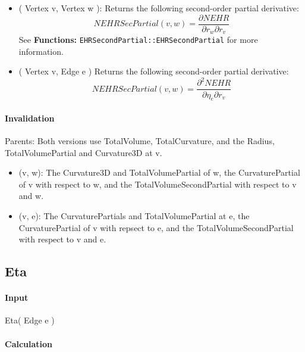 \begin{itemize}
\item ( Vertex v, Vertex w ): Returns the following second-order partial
derivative: 
\begin{equation*}
NEHRSecPartial(v,w)=\frac{\partial NEHR}{\partial r_{w}\partial r_{v}}
\end{equation*}%
See \textbf{Functions: }\texttt{EHRSecondPartial::EHRSecondPartial} for more
information.

\item ( Vertex v, Edge e ) Returns the following second-order partial
derivative: 
\begin{equation*}
NEHRSecPartial(v,w)=\frac{\partial ^{2}NEHR}{\partial \eta _{e}\partial r_{v}%
}
\end{equation*}
\end{itemize}

\paragraph{Invalidation}

\bigskip Parents: Both versions use TotalVolume, TotalCurvature, and the
Radius, TotalVolumePartial and Curvature3D at v. 

\begin{itemize}
\item (v, w): The Curvature3D and TotalVolumePartial of w, the
CurvaturePartial of v with respect to w, and the TotalVolumeSecondPartial
with respect to v and w.

\item (v, e): The CurvaturePartials and TotalVolumePartial at e, the
CurvaturePartial of v with repsect to e, and the TotalVolumeSecondPartial
with respect to v and e.
\end{itemize}

\subsection{Eta}

\paragraph{Input}

Eta( Edge e )

\paragraph{Calculation}

